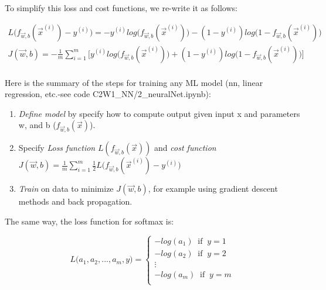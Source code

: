 \documentclass[12pt]{report}
\begin{document}
To simplify this loss and cost functions, we re-write it as follows:

\begin{multline}
L\big(f_{\overrightarrow{w},b} (\overrightarrow{x}^{(i)})   - y^{(i)} \big) = - y^{(i)} log\big( f_{\overrightarrow{w},b} (\overrightarrow{x}^{(i)}) \big) - (1-y^{(i)}) log\big(1-f_{\overrightarrow{w},b} (\overrightarrow{x}^{(i)}) \big) \\
J(\overrightarrow{w},b)   = -\frac{1}{m} \sum_{i=1}^{m} \big[ y^{(i)} log\big( f_{\overrightarrow{w},b} (\overrightarrow{x}^{(i)}) \big) + (1-y^{(i)}) log\big(1-f_{\overrightarrow{w},b} (\overrightarrow{x}^{(i)}) \big)  \big] \\
\end{multline}


Here is the summary of the steps for training any ML model (nn, linear regression, etc.-see code C2W1\_NN/2\_neuralNet.ipynb):
\begin{enumerate}
  \item \textit{Define model} by specify how to compute output given input x and parameters w, and b ($f_{\overrightarrow{w},b} (\overrightarrow{x})$).
  \item Specify \textit{Loss function} $L (f_{\overrightarrow{w},b} (\overrightarrow{x}) )  $ and \textit{cost function} $J(\overrightarrow{w},b) = \frac{1}{m} \sum_{i=1}^{m} \frac{1}{2}  L\big(f_{\overrightarrow{w},b} (\overrightarrow{x}^{(i)}) - y^{(i)} \big)$
  \item \textit{Train} on data to minimize $J(\overrightarrow{w},b)$, for example using gradient descent methods and back propagation.
\end{enumerate}

The same way, the loss function for softmax is:

\begin{equation}
  L\big( a_1, a_2, ..., a_m, y \big) =
  \begin{cases}
    -log ( a_1 )  \;\; \text{if} \;\; y = 1  \\
    -log ( a_2 )  \;\; \text{if} \;\; y = 2  \\
    \vdots\\
    -log ( a_m )  \;\; \text{if} \;\; y = m  \\
  \end{cases}
  \label{eq:softmaxLoss}
\end{equation}
\end{document}
